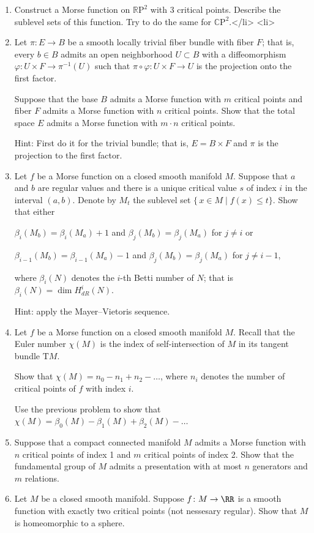 \begin{enumerate}
Hint: First do it locally and then use a partition of unity.

\item  Construct a Morse function on \(\mathbb{R}\mathrm{P}^2\) with 3 critical points.
Describe the sublevel sets of this function.
Try to do the same for \(\mathbb{C}\mathrm{P}^2\).</li>
<li>

\item Let \(\pi\colon E\to B\) be a smooth locally trivial fiber bundle with fiber \(F\);
that is, every \(b \in B\) admits an open neighborhood \(U \subset B\) with a diffeomorphism \(\varphi : U \times F\to \pi^{-1}(U)\) such that \(\pi\circ \varphi \colon U \times F\to U\) is the projection onto the first factor.

Suppose that the base \(B\) admits a Morse function with \(m\) critical points and fiber \(F\) admits a Morse function with \(n\) critical points.
Show that the total space \(E\) admits a Morse function with \(m{\cdot}n\) critical points.

Hint: First do it for the trivial bundle; that is, \(E= B\times F\) and \(\pi\) is the projection to the first factor.

\item Let \(f\) be a Morse function on a closed smooth manifold \(M\).
Suppose that \(a\) and \(b\) are regular values and there is a unique critical value \(s\) of index \(i\) in the interval \((a,b)\).
Denote by \(M_t\) the sublevel set \(\{\,x\in M\mid f(x)\le t\}\).
Show that either

\(\beta_i(M_b)=\beta_i(M_a)+1\) and  \(\beta_j(M_b)=\beta_j(M_a)\) for \(j\ne i\) or

\(\beta_{i-1}(M_b)=\beta_{i-1}(M_a)-1\) and  \(\beta_j(M_b)=\beta_j(M_a)\) for \(j\ne i-1\),

where \(\beta_i(N)\) denotes the \(i\)-th Betti number of \(N\); that is \(\beta_i(N)=\dim H^i_{dR}(N)\).

Hint: apply the Mayer--Vietoris sequence.

\item Let \(f\) be a Morse function on a closed smooth manifold \(M\).
Recall that the Euler number \(\chi (M)\) is the index of self-intersection of \(M\) in its tangent bundle \(\mathrm{T}M\).

Show that \(\chi (M)=n_0-n_1+n_2-\dots\), where \(n_i\) denotes the number of critical points of \(f\) with index \(i\).

Use the previous problem to show that \(\chi (M)=\beta_0(M)-\beta_1(M)+\beta_2(M)-\dots\)

\item  Suppose that a compact connected manifold \(M\) admits a Morse function with \(n\) critical points of index 1 and \(m\) critical points of index 2.
Show that the fundamental group of \(M\) admits a presentation with at most \(n\) generators and \(m\) relations.

\item Let $M$ be a closed smooth manifold. Suppose $f\colon M\to\RR$ is a smooth function with exactly two critical points (not nessesary regular). Show that $M$ is homeomorphic to a sphere.
\end{enumerate}

